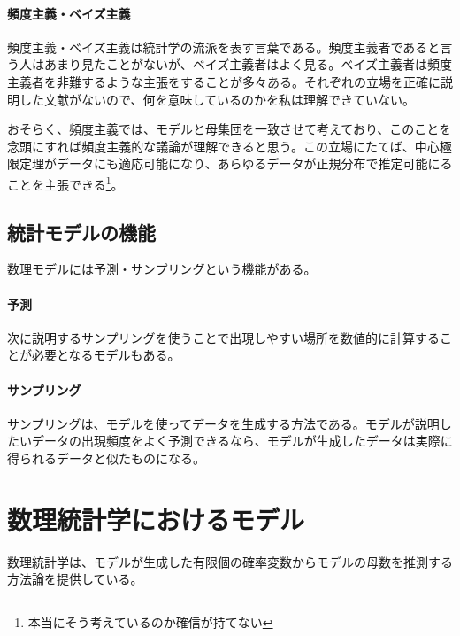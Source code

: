 \clearpage
\clearpage
\newpage
{}
\begin{mybox}
    \paragraph{頻度主義・ベイズ主義}
    頻度主義・ベイズ主義は統計学の流派を表す言葉である。頻度主義者であると言う人はあまり見たことがないが、ベイズ主義者はよく見る。ベイズ主義者は頻度主義者を非難するような主張をすることが多々ある。それぞれの立場を正確に説明した文献がないので、何を意味しているのかを私は理解できていない。

    おそらく、頻度主義では、モデルと母集団を一致させて考えており、このことを念頭にすれば頻度主義的な議論が理解できると思う。この立場にたてば、中心極限定理がデータにも適応可能になり、あらゆるデータが正規分布で推定可能にることを主張できる\footnote{本当にそう考えているのか確信が持てない}。
\end{mybox}
\fi


\begin{brokenbox}[colback=yellow]
    \blindtext[5]
  \end{brokenbox}
\fi 

\clearpage
\clearpage
\subsection{統計モデルの機能}
数理モデルには予測・サンプリングという機能がある。%
\paragraph{予測}

次に説明するサンプリングを使うことで出現しやすい場所を数値的に計算することが必要となるモデルもある。

\paragraph{サンプリング}
サンプリングは、モデルを使ってデータを生成する方法である。モデルが説明したいデータの出現頻度をよく予測できるなら、モデルが生成したデータは実際に得られるデータと似たものになる。




\section{数理統計学におけるモデル}
数理統計学は、モデルが生成した有限個の確率変数からモデルの母数を推測する方法論を提供している。

